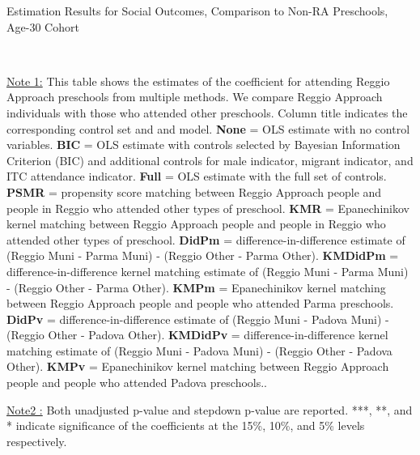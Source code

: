 \begin{table}[H] \caption{Estimation Results for Social Outcomes, Comparison to Non-RA Preschools, Age-30 Cohort} \label{ols-S-adult30-reg-other}
\scalebox{0.6}{}
\vspace{1ex} \\
\footnotesize\raggedright{\underline{Note 1:} This table shows the estimates of the coefficient for attending Reggio Approach preschools from multiple methods. We compare Reggio Approach individuals with those who attended other preschools. Column title indicates the corresponding control set and and model. \textbf{None} = OLS estimate with no control variables. \textbf{BIC} = OLS estimate with controls selected by Bayesian Information Criterion (BIC) and additional controls for male indicator, migrant indicator, and ITC attendance indicator. \textbf{Full} = OLS estimate with the full set of controls. \textbf{PSMR} =  propensity score matching between Reggio Approach people and people in Reggio who attended other types of preschool. \textbf{KMR} = Epanechinikov kernel matching between Reggio Approach people and people in Reggio who attended other types of preschool. \textbf{DidPm} = difference-in-difference estimate of (Reggio Muni - Parma Muni) - (Reggio Other - Parma Other). \textbf{KMDidPm} = difference-in-difference kernel matching estimate of (Reggio Muni - Parma Muni) - (Reggio Other - Parma Other).   \textbf{KMPm} = Epanechinikov kernel matching between Reggio Approach people and people who attended Parma preschools. \textbf{DidPv} = difference-in-difference estimate of (Reggio Muni - Padova Muni) - (Reggio Other - Padova Other). \textbf{KMDidPv} = difference-in-difference kernel matching estimate of (Reggio Muni - Padova Muni) - (Reggio Other - Padova Other).  \textbf{KMPv} = Epanechinikov kernel matching between Reggio Approach people and people who attended Padova preschools..}

\footnotesize\raggedright{\underline{Note2 :} Both unadjusted p-value and stepdown p-value are reported. ***, **, and * indicate significance of the coefficients at the 15\%, 10\%, and 5\% levels respectively.}
\end{table}

